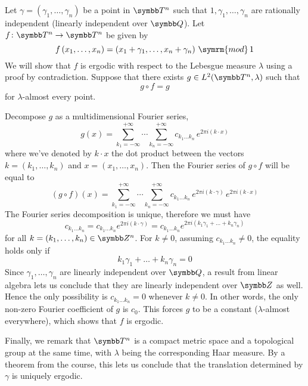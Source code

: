 \begin{problem}
Let \(\gamma = \left(\gamma_1, \dots, \gamma_n\right)\) be a point in \(\torus^n\) such that \(1, \gamma_1, \dots, \gamma_n\) are rationally independent (linearly independent over \(\rationals\)). Let \(f \colon \torus^n \to \torus^n\) be given by
\[
    f\left(x_1, \dots, x_n\right) = \left(x_1 + \gamma_1, \dots, x_n + \gamma_n\right) \, \symrm{mod} \, 1
\]
We will show that \(f\) is ergodic with respect to the Lebesgue measure \(\lambda\) using a proof by contradiction. Suppose that there exists \(g \in L^2 (\torus^n, \lambda)\) such that
\[
    g \circ f = g
\]
for \(\lambda\)-almost every point.

Decompose \(g\) as a multidimensional Fourier series,
\[
    g (x) = \sum_{k_1 = -\infty}^{+\infty} \cdots \sum_{k_n = -\infty}^{+\infty} c_{k_1 \dots k_n} \, e^{2 \pi i (k \cdot x)}
\]
where we've denoted by \(k \cdot x\) the dot product between the vectors \(k = \left(k_1, \dots, k_n\right)\) and \(x = \left(x_1, \dots, x_n\right)\). Then the Fourier series of \(g \circ f\) will be equal to
\[
    (g \circ f) (x) = \sum_{k_1 = -\infty}^{+\infty} \cdots \sum_{k_n = -\infty}^{+\infty} c_{k_1 \dots k_n} \, e^{2 \pi i (k \cdot \gamma)} \, e^{2 \pi i (k \cdot x)}
\]
The Fourier series decomposition is unique, therefore we must have
\[
    c_{k_1 \dots k_n} = c_{k_1 \dots k_n} e^{2 \pi i (k \cdot \gamma)} = c_{k_1 \dots k_n} e^{2 \pi i (k_1 \gamma_1 + \dots + k_n \gamma_n)}
\]
for all \(k = \left(k_1, \dots, k_n\right) \in \integers^n\). For \(k \neq 0\), assuming \(c_{k_1 \dots k_n} \neq 0\), the equality holds only if
\[
    k_1 \gamma_1 + \dots + k_n \gamma_n = 0
\]
Since \(\gamma_1, \dots, \gamma_n\) are linearly independent over \(\rationals\), a result from linear algebra lets us conclude that they are linearly independent over \(\integers\) as well. Hence the only possibility is \(c_{k_1 \dots k_n} = 0\) whenever \(k \neq 0\). In other words, the only non-zero Fourier coefficient of \(g\) is \(c_0\). This forces \(g\) to be a constant (\(\lambda\)-almost everywhere), which shows that \(f\) is ergodic.

Finally, we remark that \(\torus^n\) is a compact metric space and a topological group at the same time, with \(\lambda\) being the corresponding Haar measure. By a theorem from the course, this lets us conclude that the translation determined by \(\gamma\) is uniquely ergodic.

\begin{comment}
To show that it is uniquely ergodic, we will use a theorem due to Furstenberg, from his paper ``\href{https://www.jstor.org/stable/2372899}{Strict Ergodicity and Transformation of the Torus}'':


\end{comment}
\end{problem}
